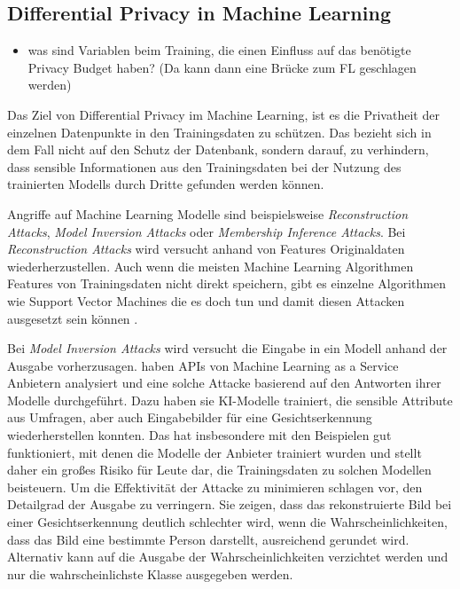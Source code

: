 \subsection{Differential Privacy in Machine Learning}\label{sec:fund-dp-in-ml}

\begin{itemize}
	\item was sind Variablen beim Training, die einen Einfluss auf das benötigte Privacy Budget haben? (Da kann dann eine Brücke zum FL geschlagen werden)
\end{itemize}

Das Ziel von Differential Privacy im Machine Learning, ist es die Privatheit der einzelnen Datenpunkte in den Trainingsdaten zu schützen. Das bezieht sich in dem Fall nicht auf den Schutz der Datenbank, sondern darauf, zu verhindern, dass sensible Informationen aus den Trainingsdaten bei der Nutzung des trainierten Modells durch Dritte gefunden werden können. 

Angriffe auf Machine Learning Modelle sind beispielsweise \textit{Reconstruction Attacks}, \textit{Model Inversion Attacks} oder \textit{Membership Inference Attacks}. Bei \textit{Reconstruction Attacks} wird versucht anhand von Features Originaldaten wiederherzustellen. Auch wenn die meisten Machine Learning Algorithmen Features von Trainingsdaten nicht direkt speichern, gibt es einzelne Algorithmen wie Support Vector Machines die es doch tun und damit diesen Attacken ausgesetzt sein können \cite[p.9ff]{chang:2023}.

Bei \textit{Model Inversion Attacks} wird versucht die Eingabe in ein Modell anhand der Ausgabe vorherzusagen. \textcite{fredrikson:2015} haben APIs von Machine Learning as a Service Anbietern analysiert und eine solche Attacke basierend auf den Antworten ihrer Modelle durchgeführt. Dazu haben sie KI-Modelle trainiert, die sensible Attribute aus Umfragen, aber auch Eingabebilder für eine Gesichtserkennung wiederherstellen konnten. Das hat insbesondere mit den Beispielen gut funktioniert, mit denen die Modelle der Anbieter trainiert wurden und stellt daher ein großes Risiko für Leute dar, die Trainingsdaten zu solchen Modellen beisteuern. Um die Effektivität der Attacke zu minimieren schlagen \citeauthor{fredrikson:2015} vor, den Detailgrad der Ausgabe zu verringern. Sie zeigen, dass das rekonstruierte Bild bei einer Gesichtserkennung deutlich schlechter wird, wenn die Wahrscheinlichkeiten, dass das Bild eine bestimmte Person darstellt, ausreichend gerundet wird. Alternativ kann auf die Ausgabe der Wahrscheinlichkeiten verzichtet werden und nur die wahrscheinlichste Klasse ausgegeben werden.

